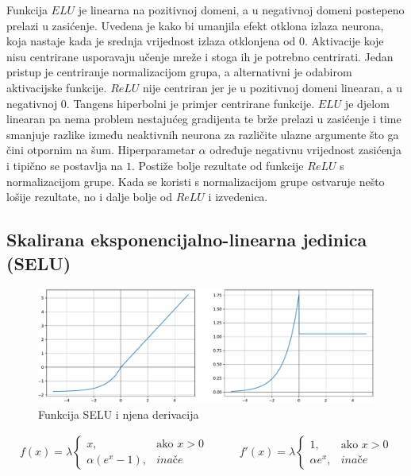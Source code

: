 \documentclass[times, utf8, numeric, diplomski]{fer}
\def\otherwise{\textit{inače}}
\begin{document}
Funkcija $ELU$ je linearna na pozitivnoj domeni, a u negativnoj domeni postepeno prelazi u zasićenje. Uvedena je kako bi umanjila efekt otklona izlaza neurona, koja nastaje kada je srednja vrijednost izlaza otklonjena od $0$. Aktivacije koje nisu centrirane usporavaju učenje mreže i stoga ih je potrebno centrirati. Jedan pristup je centriranje normalizacijom grupa, a alternativni je odabirom aktivacijske funkcije. $ReLU$ nije centriran jer je u pozitivnoj domeni linearan, a u negativnoj $0$. Tangens hiperbolni je primjer centrirane funkcije. $ELU$ je djelom linearan pa nema problem nestajućeg gradijenta te brže prelazi u zasićenje i time smanjuje razlike između neaktivnih neurona za različite ulazne argumente što ga čini otpornim na šum. Hiperparametar $\alpha$ određuje negativnu vrijednost zasićenja i tipično se postavlja na $1$. Postiže bolje rezultate od funkcije $ReLU$ s normalizacijom grupe. Kada se koristi s normalizacijom grupe ostvaruje nešto lošije rezultate, no i dalje bolje od $ReLU$ i izvedenica. \citep{elu}

\subsection{Skalirana eksponencijalno-linearna jedinica (SELU)}

\begin{figure}[H]
\includegraphics[width=\textwidth]{SELU.pdf}
\centering
\caption{Funkcija SELU i njena derivacija}
\label{fig:selu}
\end{figure}

\begin{equation}
\label{eq:selu}
\begin{split}
f(x) = \lambda
\begin{cases}
x,					& \text{ako } x > 0 \\
\alpha (e^x - 1),	& \otherwise
\end{cases}
\end{split}
\qquad
\begin{split}
f'(x) = \lambda
\begin{cases}
1,	 		& \text{ako } x > 0 \\
\alpha e^x,	& \otherwise
\end{cases}
\end{split}
\end{equation}
\end{document}
